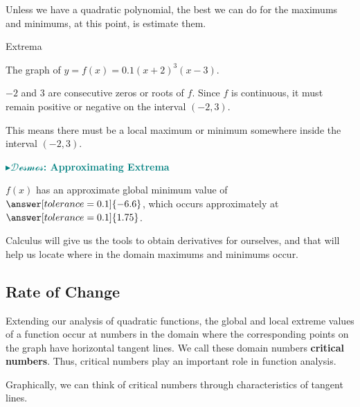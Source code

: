 \documentclass{ximera}
\begin{document}
Unless we have a quadratic polynomial, the best we can do for the maximums and minimums, at this point, is estimate them.







\begin{example} Extrema

The graph of $y = f(x) = 0.1(x+2)^3(x-3)$.

$-2$ and $3$ are consecutive zeros or roots of $f$.  Since $f$ is continuous, it must remain positive or negative on the interval $(-2,3)$.

This means there must be a local maximum or minimum somewhere inside the interval $(-2,3)$.


\begin{onlineOnly}
\textbf{\textcolor{teal}{$\blacktriangleright \mathcal{Desmos}$: Approximating Extrema}} 
\begin{center}
\end{center}
\end{onlineOnly}


$f(x)$ has an approximate global minimum value of $\answer[tolerance=0.1]{-6.6}$, which occurs approximately at $\answer[tolerance=0.1]{1.75}$.


\end{example}

Calculus will give us the tools to obtain derivatives for ourselves, and that will help us locate where in the domain maximums and minimums occur.




\subsection*{Rate of Change}


Extending our analysis of quadratic functions, the global and local extreme values of a function occur at numbers in the domain where the corresponding points on the graph have horizontal tangent lines. We call these domain numbers \textbf{critical numbers}.  Thus, critical numbers play an important role in function analysis.  


Graphically, we can think of critical numbers through characteristics of tangent lines.
\end{document}
